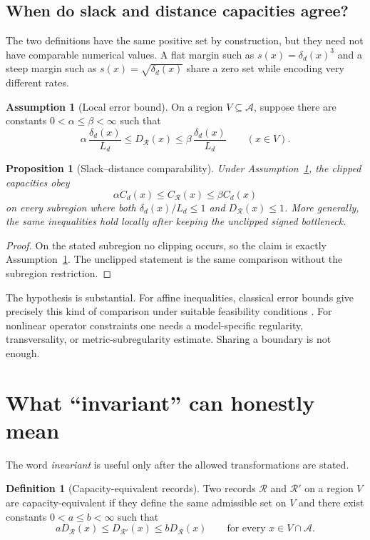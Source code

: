 \documentclass[11pt]{article}
\newtheorem{proposition}[theorem]{Proposition}
\theoremstyle{definition}
\newtheorem{definition}[theorem]{Definition}
\newtheorem{assumption}[theorem]{Assumption}
\theoremstyle{remark}
\newcommand{\cA}{\mathcal A}
\newcommand{\cR}{\mathcal R}
\begin{document}
\subsection{When do slack and distance capacities agree?}

The two definitions have the same positive set by construction, but they
need not have comparable numerical values.  A flat margin such as
\(s(x)=\delta_d(x)^3\) and a steep margin such as
\(s(x)=\sqrt{\delta_d(x)}\) share a zero set while encoding very different
rates.

\begin{assumption}[Local error bound]
\label{ass:errorbound}
On a region \(V\subseteq\cA\), suppose there are constants
\(0<\alpha\le\beta<\infty\) such that
\[
 \alpha\,\frac{\delta_d(x)}{L_d}
 \le
 D_{\cR}(x)
 \le
 \beta\,\frac{\delta_d(x)}{L_d}
 \qquad (x\in V).
\]
\end{assumption}

\begin{proposition}[Slack--distance comparability]
\label{prop:comparison}
Under Assumption~\ref{ass:errorbound}, the clipped capacities obey
\[
 \alpha C_d(x)
 \le C_{\cR}(x)
 \le \beta C_d(x)
\]
on every subregion where both
\(\delta_d(x)/L_d\le1\) and \(D_{\cR}(x)\le1\).
More generally, the same inequalities hold locally after keeping the
unclipped signed bottleneck.
\end{proposition}

\begin{proof}
On the stated subregion no clipping occurs, so the claim is exactly
Assumption~\ref{ass:errorbound}.  The unclipped statement is the same comparison
without the subregion restriction.
\end{proof}

The hypothesis is substantial.  For affine inequalities, classical error
bounds give precisely this kind of comparison under suitable feasibility
conditions \cite{Hoffman1952}.  For nonlinear operator constraints one
needs a model-specific regularity, transversality, or metric-subregularity
estimate.  Sharing a boundary is not enough.

\section{What ``invariant'' can honestly mean}
\label{sec:invariance}

The word \emph{invariant} is useful only after the allowed transformations
are stated.

\begin{definition}[Capacity-equivalent records]
\label{def:equiv}
Two records \(\cR\) and \(\cR'\) on a region \(V\) are
capacity-equivalent if they define the same admissible set on \(V\) and
there exist constants \(0<a\le b<\infty\) such that
\[
 aD_{\cR}(x)\le D_{\cR'}(x)\le bD_{\cR}(x)
 \qquad
 \text{for every }x\in V\cap\cA.
\]
\end{definition}
\end{document}
